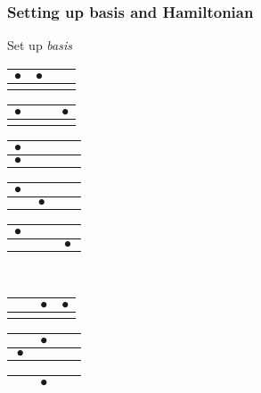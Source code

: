 \begin{frame}[t]
  \frametitle{Setting up basis and Hamiltonian}
  \footnotesize
  Set up \emph{basis}
  \begin{center}
  \vspace{-0.5em}
  \begin{tabular}{|c|c|c|}
  \hline
  $\bullet$ & $\bullet$ & $\phantom{\bullet}$ \\ \hline
  &  &  \\
  \hline
  \end{tabular}
  \begin{tabular}{|c|c|c|}
  \hline
  $\bullet$ & $\phantom{\bullet}$ & $\bullet$ \\ \hline
  &  &  \\
  \hline
  \end{tabular}
  \begin{tabular}{|c|c|c|}
  \hline
  $\bullet$ & $\phantom{\bullet}$ & $\phantom{\bullet}$ \\ \hline
  $\bullet$ &  &  \\
  \hline
  \end{tabular}
  \begin{tabular}{|c|c|c|}
  \hline
  $\bullet$ & $\phantom{\bullet}$ & $\phantom{\bullet}$ \\ \hline
  & $\bullet$ &  \\
  \hline
  \end{tabular}
  \begin{tabular}{|c|c|c|}
  \hline
  $\bullet$ & $\phantom{\bullet}$ & $\phantom{\bullet}$ \\ \hline
  &  & $\bullet$ \\
  \hline
  \end{tabular} \\
  \vspace{0.5em}
  \begin{tabular}{|c|c|c|}
  \hline
  $\phantom{\bullet}$ & $\bullet$ & $\bullet$ \\ \hline
  &  &  \\
  \hline
  \end{tabular}
  \begin{tabular}{|c|c|c|}
  \hline
  $\phantom{\bullet}$ & $\bullet$ & $\phantom{\bullet}$ \\ \hline
  $\bullet$ &  &  \\
  \hline
  \end{tabular}
  \begin{tabular}{|c|c|c|}
  \hline
  $\phantom{\bullet}$ & $\bullet$ & $\phantom{\bullet}$ \\ \hline

\end{tabular}
\end{center}
\end{frame}
